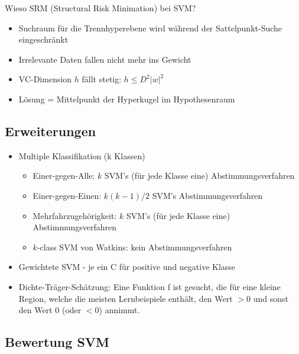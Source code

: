 \documentclass[paper=a4, fontsize=11pt]{scrartcl} %
\numberwithin{equation}{section} %
\numberwithin{figure}{section} %
\numberwithin{table}{section} %
\begin{document}
Wieso SRM (Structural Risk Minimation) bei SVM?
\begin{itemize}
\item Suchraum für die Trennhyperebene wird während der Sattelpunkt-Suche eingeschränkt
\item Irrelevante Daten fallen nicht mehr ins Gewicht
\item VC-Dimension $h$ fällt stetig: $h \le D^2|w|^2$
\item Lösung = Mittelpunkt der Hyperkugel im Hypothesenraum
\end{itemize}

\subsection{Erweiterungen}

\begin{itemize}
\item Multiple Klassifikation (k Klassen)
\begin{itemize}
\item Einer-gegen-Alle: $k$ SVM's (für jede Klasse eine) Abstimmungsverfahren
\item Einer-gegen-Einen: $k(k-1)/2$ SVM's Abstimmungsverfahren
\item Mehrfahrzugehörigkeit: $k$ SVM's (für jede Klasse eine) Abstimmungsverfahren
\item $k$-class SVM von Watkins: kein Abstimmungsverfahren
\end{itemize}
\item Gewichtete SVM - je ein C für positive und negative Klasse
\item Dichte-Träger-Schätzung: Eine Funktion f ist gesucht, die für eine kleine Region, welche die meisten Lernbeispiele enthält, den Wert $>0$ und sonst den Wert $0$ (oder $<0$) annimmt.
\end{itemize}

\subsection{Bewertung SVM}
\end{document}

